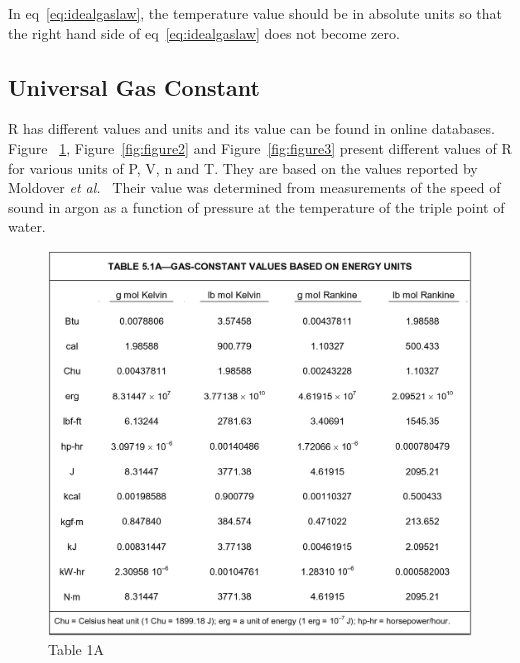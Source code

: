 \documentclass[16pt,a4paper]{article}
\begin{document}
In eq~\ref{eq:idealgaslaw}, the temperature value should be in absolute units so that the right hand side of eq~\ref{eq:idealgaslaw} does not become zero.


\subsection{Universal Gas Constant}
R has different values and units and its value can be found in online databases. Figure ~\ref{fig:figure1}, Figure~\ref{fig:figure2} and Figure~\ref{fig:figure3} present different values of R for various units of P, V, n and T. They are based on the values reported by Moldover \emph{et al.}~\cite{PhysRevLett.60.249} Their value was determined from measurements of the speed of sound in argon as a function of pressure at the temperature of the triple point of water.
\begin{figure}[!hbpt]
    \includegraphics[scale=1]{images/vol_1.png}
    \caption{Table 1A}
    \label{fig:figure1}
\end{figure}
\end{document}
